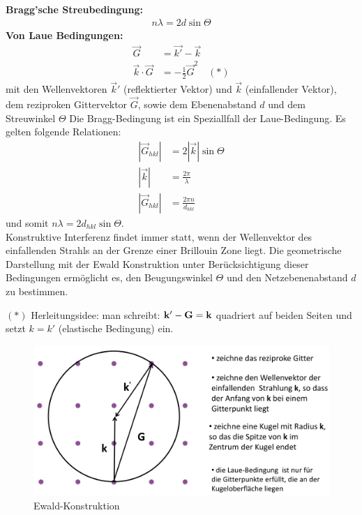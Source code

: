 \textbf{Bragg'sche Streubedingung:}
\begin{align}
    n\lambda = 2 d \sin{\Theta} 
\end{align}
\textbf{Von Laue Bedingungen:}
\begin{align}
\vec{G} &= \vec{k'} - \vec{k} \\
\vec{k} \cdot \vec{G} &= -\frac{1}{2} \vec{G}^2 \quad (*)
\end{align}
mit den Wellenvektoren $\vec{k}'$ (reflektierter Vektor) und $\vec{k}$ (einfallender Vektor), dem reziproken Gittervektor $\vec{G}$, sowie dem Ebenenabstand $d$ und dem Streuwinkel $\Theta$ Die Bragg-Bedingung ist ein Speziallfall der Laue-Bedingung. Es gelten folgende Relationen:
\begin{align}
    |\vec{G}_{hkl}| &= 2 |\vec{k}| \sin{\Theta} \\
    |\vec{k}| &= \frac{2 \pi}{\lambda} \\
    |\vec{G}_{hkl}| &= \frac{2 \pi n}{d_{hkl}}
\end{align}
und somit $n \lambda = 2 d_{hkl}  \sin{\Theta}$. \\
Konstruktive Interferenz findet immer statt, wenn der Wellenvektor des
einfallenden Strahls an der Grenze einer Brillouin Zone liegt. Die geometrische Darstellung mit der Ewald Konstruktion unter Berücksichtigung dieser Bedingungen ermöglicht es, den Beugungswinkel $\Theta$ und den Netzebenenabstand $d$ zu bestimmen. 

$(*)$ Herleitungsidee: man schreibt: $\vb{k}'-\vb{G} = \vb{k}$ quadriert auf beiden Seiten und setzt $k=k'$ (elastische Bedingung) ein. 

\begin{figure}[H]
    \centering
    \begin{samepage}
        \includegraphics[width=0.8\linewidth]{resources/09-05-2012/Ewald_Konstruktion.png}
        \caption{Ewald-Konstruktion}
    \end{samepage}
\end{figure}

